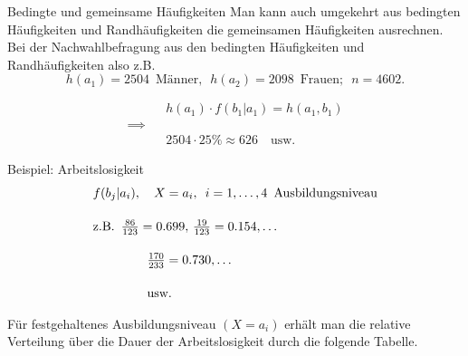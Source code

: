 \documentclass[
  10pt,
  ignorenonframetext,
]{beamer}
\begin{document}
\begin{frame}{Bedingte und gemeinsame Häufigkeiten}
\label{bedingte-und-gemeinsame-huxe4ufigkeiten}
Man kann auch umgekehrt aus bedingten Häufigkeiten und Randhäufigkeiten
die gemeinsamen Häufigkeiten ausrechnen. Bei der Nachwahlbefragung aus
den bedingten Häufigkeiten und Randhäufigkeiten also z.B. \[
h(a_1) = 2504\,\,\, \mbox{Männer},\,\,\, h(a_2) = 2098 \,\,\,\mbox{Frauen}; \,\,\,n = 4602.
\]

\[
\begin{array}{lcl}
& & h(a_1)\cdot f(b_1|a_1) = h(a_1,b_1)\\
\implies & &\\
& & 2504\cdot 25\% \approx 626 \quad\mbox{usw.}
\end{array}
\]
\end{frame}

\begin{frame}{Beispiel: Arbeitslosigkeit}
\label{beispiel-arbeitslosigkeit-1}
\begin{displaymath}
  \begin{array}{l}
      f(b_j|a_i), \quad X = a_i, \,\,\,i=1,\ldots,4 \,\,\,\mbox{Ausbildungsniveau}
      \\*[0.5cm] \mbox{z.B.}\,\,\, \frac{86}{123} = 0.699, \,\frac{19}{123} = 0.154,\ldots
      \\*[0.5cm] \hspace*{1.5cm}\frac{170}{233} = 0.730,\ldots
      \\*[0.5cm] \hspace*{1.5cm} \mbox{usw.}
  \end{array}
\end{displaymath}

\vspace*{1cm}

Für festgehaltenes Ausbildungsniveau \((X=a_i)\) erhält man die relative
Verteilung über die Dauer der Arbeitslosigkeit durch die folgende
Tabelle.
\end{frame}
\end{document}
